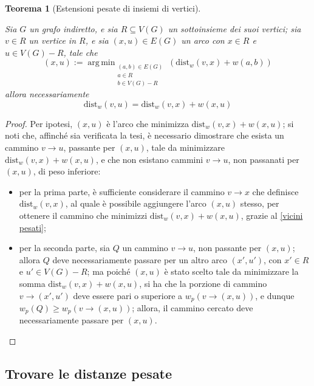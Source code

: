 \documentclass[14pt]{extreport}
\DeclareMathOperator*{\argmin}{arg\,min}
\newtheorem{theorem}{Teorema}[subsection]
\theoremstyle{definition}
\theoremstyle{definition}
\begin{document}
\begin{theorem}[Estensioni pesate di insiemi di vertici]
    \label{dijkstra theorem}

    Sia $G$ un grafo indiretto, e sia $R \subseteq V(G)$ un sottoinsieme dei suoi vertici; sia $v\in R$ un vertice in $R$, e sia $(x, u) \in E(G)$ un arco con $x \in R$ e $u \in V(G) - R$, tale che $$(x, u):= \argmin_{\substack{(a, b) \in E(G) \\ a \in R \\ b \in V(G) - R}}{\left(\mathrm{dist}_w(v, x) + w(a, b)\right)}$$ allora necessariamente $$\mathrm{dist}_w(v, u) = \mathrm{dist}_w(v, x) + w(x, u)$$
\end{theorem}

\begin{proof}
    Per ipotesi, $(x, u)$ è l'arco che minimizza $\mathrm{dist}_w(v, x) + w(x, u)$; si noti che, affinché sia verificata la tesi, è necessario dimostrare che esista un cammino $v \rightarrow u$, passante per $(x, u)$, tale da minimizzare $\mathrm{dist}_w(v, x) + w(x, u)$, e che non esistano cammini $v \rightarrow u$, non passanati per $(x, u)$, di peso inferiore:

    \begin{itemize}
        \item per la prima parte, è sufficiente considerare il cammino $v \rightarrow x$ che definisce $\mathrm{dist}_w(v, x)$, al quale è possibile aggiungere l'arco $(x, u)$ stesso, per ottenere il cammino che minimizzi $\mathrm{dist}_w(v, x) + w(x, u)$, grazie al \cref{vicini pesati};
        \item per la seconda parte, sia $Q$ un cammino $v \rightarrow u$, non passante per $(x, u)$; allora $Q$ deve necessariamente passare per un altro arco $(x', u')$, con $x' \in R$ e $u' \in V(G) - R$; ma poiché $(x, u)$ è stato scelto tale da minimizzare la somma $\mathrm{dist}_w(v, x) + w(x, u)$, si ha che la porzione di cammino $v \rightarrow (x', u')$ deve essere pari o superiore a $w_p\left(v \rightarrow (x, u)\right)$, e dunque $w_p(Q) \ge w_p(v \rightarrow (x, u))$; allora, il cammino cercato deve necessariamente passare per $(x, u)$.
    \end{itemize}
\end{proof}

\subsection{Trovare le distanze pesate}
\end{document}

